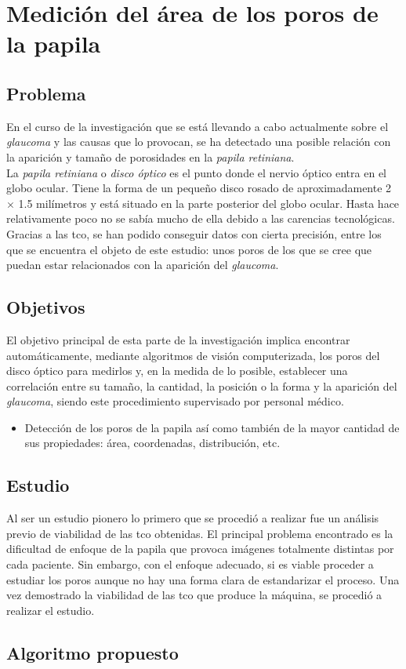 \chapter{Medición del área de los poros de la papila}
\section{Problema}
En el curso de la investigación que se está llevando a cabo
actualmente sobre el \emph{glaucoma} y las causas que lo provocan, se
ha detectado una posible relación con la aparición y tamaño de
porosidades en la \emph{papila retiniana}. \\
La \emph{papila retiniana} o \emph{disco óptico} es el punto donde el
nervio óptico entra en el globo ocular. Tiene la forma de un pequeño
disco rosado de aproximadamente 2 $\times$ 1.5 milímetros y está
situado en la parte posterior del globo ocular. Hasta hace
relativamente poco no se sabía mucho de ella debido a las carencias
tecnológicas. Gracias a las \gls{tco}, se han podido conseguir datos
con cierta precisión, entre los que se encuentra el objeto de este
estudio: unos poros de los que se cree que puedan estar
relacionados con la aparición del \emph{glaucoma}.\\

\section{Objetivos}
El objetivo principal de esta parte de la investigación implica
encontrar automáticamente, mediante algoritmos de visión
computerizada, los poros del disco óptico para medirlos y, en la
medida de lo posible, establecer una correlación entre su tamaño, la
cantidad, la posición o la forma y la aparición del \emph{glaucoma},
siendo este procedimiento supervisado por personal médico.
\begin{itemize}
\item Detección de los poros de la papila así como también de la mayor
  cantidad de sus propiedades: área, coordenadas, distribución, etc.
\end{itemize}

\section{Estudio}
Al ser un estudio pionero lo primero que se procedió a realizar fue un
análisis previo de viabilidad de las \gls{tco} obtenidas. El
principal problema encontrado es la dificultad de enfoque de la papila
que provoca imágenes totalmente distintas por cada paciente. Sin
embargo, con el enfoque adecuado, si es viable proceder a estudiar los
poros aunque no hay una forma clara de estandarizar el proceso. Una
vez demostrado la viabilidad de las \gls{tco} que produce la máquina,
se procedió a realizar el estudio.
\section{Algoritmo propuesto}
